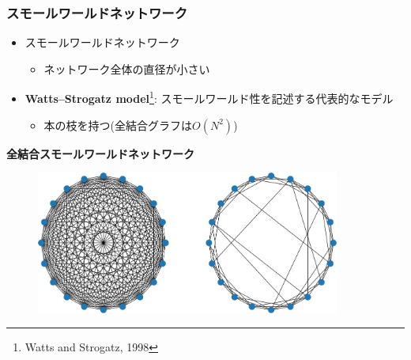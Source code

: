 
\begin{frame}\frametitle{スモールワールドネットワーク}
  \begin{itemize}
    \item スモールワールドネットワーク
    \begin{itemize}
      \item ネットワーク全体の直径が小さい
    \end{itemize}
    \item \textbf{Watts--Strogatz model}\footnote{Watts and Strogatz, 1998}: スモールワールド性を記述する代表的なモデル
    \begin{itemize}
      \item {}本の枝を持つ(全結合グラフは$O(N^{2})$)
    \end{itemize}
  \end{itemize}
  \vspace{2mm}
  \hspace{2.5cm}\textbf{全結合}\hspace{3cm}\textbf{スモールワールドネットワーク}
  \vspace{0.1mm}
  \begin{figure}
    \includegraphics[width=10cm]{figs/mf_sw-crop.pdf}
  \end{figure}
\end{frame}

